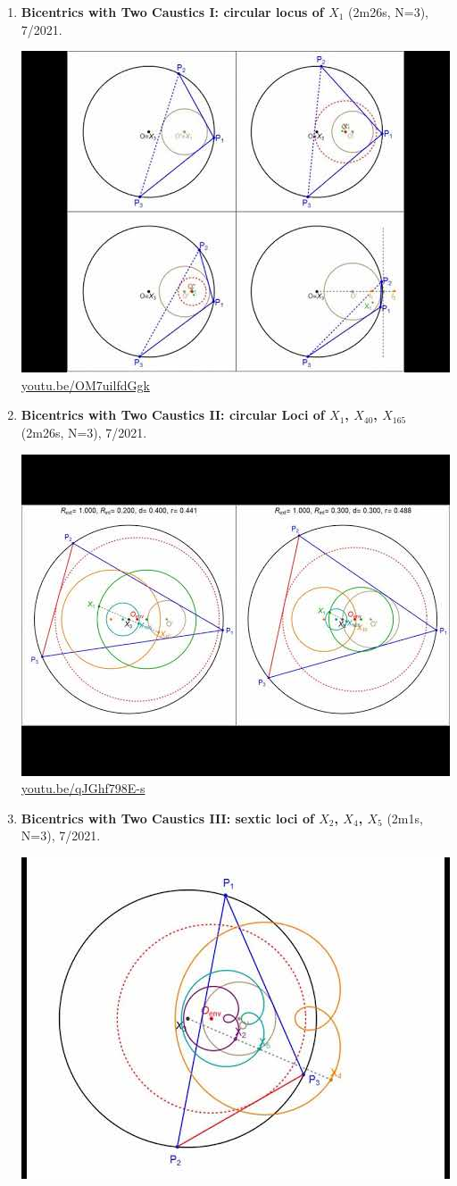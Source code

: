\documentclass[12pt]{amsart}
\begin{document}
\begin{enumerate}[resume]
\item \textbf{Bicentrics with Two Caustics I: circular locus of $X_{1}$} (2m26s, N=3), 7/2021. 
\begin{center}\includegraphics[width=.5\textwidth]{pics/OM7uilfdGgk.jpg} \\ 
\href{https://youtu.be/OM7uilfdGgk}{\url{youtu.be/OM7uilfdGgk}}\end{center}
% 
\item \textbf{Bicentrics with Two Caustics II: circular Loci of $X_{1}$, $X_{40}$, $X_{165}$} (2m26s, N=3), 7/2021. 
\begin{center}\includegraphics[width=.5\textwidth]{pics/qJGhf798E-s.jpg} \\ 
\href{https://youtu.be/qJGhf798E-s}{\url{youtu.be/qJGhf798E-s}}\end{center}
% 
\item \textbf{Bicentrics with Two Caustics III: sextic loci of $X_{2}$, $X_{4}$, $X_{5}$} (2m1s, N=3), 7/2021. 
\begin{center}\includegraphics[width=.5\textwidth]{pics/6Fqp6Z1Q-0A.jpg} \\ 

\end{center}
\end{enumerate}
\end{document}
